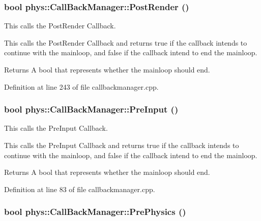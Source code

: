 \hypertarget{classphys_1_1CallBackManager_aa1a1132e877d989ecea08a16ee4b3ac1}{
\subsubsection[{PostRender}]{\setlength{\rightskip}{0pt plus 5cm}bool phys::CallBackManager::PostRender ()}}
\label{d1/d47/classphys_1_1CallBackManager_aa1a1132e877d989ecea08a16ee4b3ac1}


This calls the PostRender Callback. 

This calls the PostRender Callback and returns true if the callback intends to continue with the mainloop, and false if the callback intend to end the mainloop. \begin{DoxyReturn}{Returns}
A bool that represents whether the mainloop should end. 
\end{DoxyReturn}


Definition at line 243 of file callbackmanager.cpp.

\hypertarget{classphys_1_1CallBackManager_a84e782f8729f49b296691763351ee2b1}{
\subsubsection[{PreInput}]{\setlength{\rightskip}{0pt plus 5cm}bool phys::CallBackManager::PreInput ()}}
\label{d1/d47/classphys_1_1CallBackManager_a84e782f8729f49b296691763351ee2b1}


This calls the PreInput Callback. 

This calls the PreInput Callback and returns true if the callback intends to continue with the mainloop, and false if the callback intend to end the mainloop. \begin{DoxyReturn}{Returns}
A bool that represents whether the mainloop should end. 
\end{DoxyReturn}


Definition at line 83 of file callbackmanager.cpp.

\hypertarget{classphys_1_1CallBackManager_a65867cc4855f0f8cd84a2b4a8bbf0fd6}{
\subsubsection[{PrePhysics}]{\setlength{\rightskip}{0pt plus 5cm}bool phys::CallBackManager::PrePhysics ()}}
\label{d1/d47/classphys_1_1CallBackManager_a65867cc4855f0f8cd84a2b4a8bbf0fd6}



